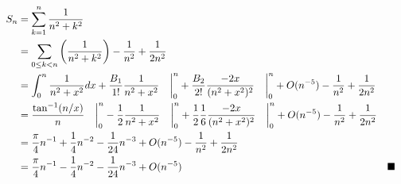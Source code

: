 \documentclass[11pt,fleqn]{article}
\begin{document}
\begin{align*}
	S_n &= \sum\limits_{k=1}^{n} \frac{1}{n^2 + k^2} \\
		&= \sum_{0 \le k < n} \left(\frac{1}{n^2 + k^2}\right) - \frac{1}{n^2} + \frac{1}{2n^2} \\
		&= \int^{n}_{0} \frac{1}{n^2 + x^2} dx + 
			\frac{B_1}{1!} \frac{1}{n^2+x^2} \left.\phantom{0\over0} \right|^{n}_{0} + 
			\frac{B_2}{2!} \frac{-2x}{(n^2+x^2)^2} \left.\phantom{0\over0} \right|^{n}_{0}
			+ O(n^{-5}) - \frac{1}{n^2} + \frac{1}{2n^2} \\
		&= \frac{\tan^{-1}(n/x)}{n} \left.\phantom{0\over0} \right|^{n}_{0}
			- \frac{1}{2} \frac{1}{n^2 + x^2} \left.\phantom{0\over0} \right|^{n}_{0} 
			+ \frac{1}{2} \frac{1}{6} \frac{-2x}{(n^2+x^2)^2}
				\left.\phantom{0\over0} \right|^{n}_{0} + O(n^{-5}) 
				- \frac{1}{n^2} + \frac{1}{2n^2} \\
		&= \frac{\pi}{4} n^{-1} + \frac{1}{4} n^{-2} - \frac{1}{24} n^{-3} + O(n^{-5}) 
				- \frac{1}{n^2} + \frac{1}{2n^2}\\
		&= \frac{\pi}{4} n^{-1} - \frac{1}{4} n^{-2} - \frac{1}{24} n^{-3} + O(n^{-5}) 
			&& \blacksquare
\end{align*}
\end{document}
